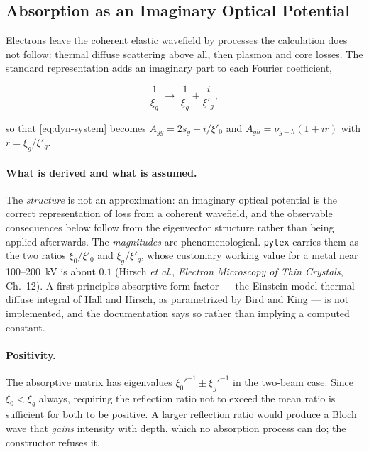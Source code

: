 \subsection{Absorption as an Imaginary Optical Potential}

Electrons leave the coherent elastic wavefield by processes the calculation does not follow:
thermal diffuse scattering above all, then plasmon and core losses. The standard
representation adds an imaginary part to each Fourier coefficient,

\begin{equation}
  \frac{1}{\xi_{g}} \;\longrightarrow\; \frac{1}{\xi_{g}} + \frac{i}{\xi'_{g}},
\end{equation}

so that \eqref{eq:dyn-system} becomes \(A_{gg} = 2s_{g} + i/\xi'_{0}\) and \(A_{gh} =
\nu_{g-h}(1 + i r)\) with \(r = \xi_{g}/\xi'_{g}\).

\paragraph{What is derived and what is assumed.} The \emph{structure} is not an
approximation: an imaginary optical potential is the correct representation of loss from a
coherent wavefield, and the observable consequences below follow from the eigenvector
structure rather than being applied afterwards. The \emph{magnitudes} are phenomenological.
\texttt{pytex} carries them as the two ratios \(\xi_{0}/\xi'_{0}\) and \(\xi_{g}/\xi'_{g}\),
whose customary working value for a metal near 100--200~kV is about
\(0.1\) (Hirsch \emph{et al.}, \emph{Electron Microscopy of Thin Crystals}, Ch.~12). A
first-principles absorptive form factor --- the Einstein-model thermal-diffuse integral of
Hall and Hirsch, as parametrized by Bird and King --- is not implemented, and the
documentation says so rather than implying a computed constant.

\paragraph{Positivity.} The absorptive matrix has eigenvalues \(\xi_{0}'^{-1} \pm
\xi_{g}'^{-1}\) in the two-beam case. Since \(\xi_{0} < \xi_{g}\) always, requiring the
reflection ratio not to exceed the mean ratio is sufficient for both to be positive. A
larger reflection ratio would produce a Bloch wave that \emph{gains} intensity with depth,
which no absorption process can do; the constructor refuses it.

